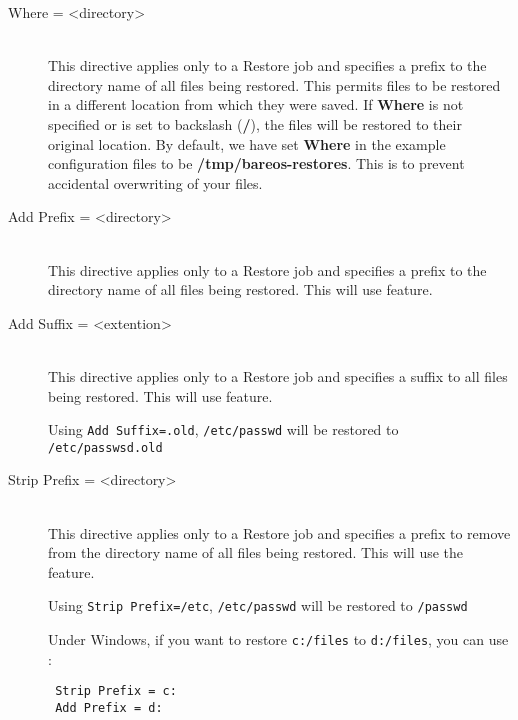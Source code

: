 \begin{description}
\item [Where = {\textless}directory{\textgreater}] \hfill \\
This directive applies only to a Restore job and specifies a prefix to
the directory name of all files being restored.  This permits files to
be restored in a different location from which they were saved.  If {\bf
Where} is not specified or is set to backslash ({\bf /}), the files will
be restored to their original location.  By default, we have set {\bf
Where} in the example configuration files to be {\bf
/tmp/bareos-restores}.  This is to prevent accidental overwriting of
your files.

\item [Add Prefix = {\textless}directory{\textgreater}] \hfill \\
\label{confaddprefix}
This directive applies only to a Restore job and specifies a prefix to the
directory name of all files being restored.  This will use  feature.

\item [Add Suffix = {\textless}extention{\textgreater}] \hfill \\
This directive applies only to a Restore job and specifies a suffix to all
files being restored.  This will use 
feature.

Using \texttt{Add Suffix=.old}, \texttt{/etc/passwd} will be restored to
\texttt{/etc/passwsd.old}

\item [Strip Prefix = {\textless}directory{\textgreater}] \hfill \\
This directive applies only to a Restore job and specifies a prefix to remove
from the directory name of all files being restored.  This will use the
 feature.

Using \texttt{Strip Prefix=/etc}, \texttt{/etc/passwd} will be restored to
\texttt{/passwd}

Under Windows, if you want to restore \texttt{c:/files} to \texttt{d:/files},
you can use :

\begin{verbatim}
 Strip Prefix = c:
 Add Prefix = d:
\end{verbatim}


\end{description}
